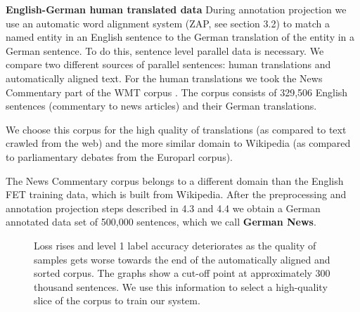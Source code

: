 \documentclass[11pt,a4paper]{article}
\begin{document}
\textbf{English-German human translated data} During annotation projection we use an automatic word alignment system (ZAP, see section 3.2) to match a named entity in an English sentence to the German translation of the entity in a German sentence. To do this, sentence level parallel data is necessary. We compare two different sources of parallel sentences: human translations and automatically aligned text. For the human translations we took the News Commentary part of the WMT corpus \cite{barrault2019findings}. The corpus consists of 329,506 English sentences (commentary to news articles) and their German translations. 

We choose this corpus for the high quality of translations (as compared to text crawled from the web) and the more similar domain to Wikipedia (as compared to parliamentary debates from the Europarl corpus).

The News Commentary corpus belongs to a different domain than the English FET training data, which is built from Wikipedia. After the preprocessing and annotation projection steps described in 4.3 and 4.4 we obtain a German annotated data set of 500,000 sentences, which we call \textbf{German News}.

\begin{figure}[h!]%
    \centering
    \qquad
    \caption{Loss rises and level 1 label accuracy deteriorates as the quality of samples gets worse towards the end of the automatically aligned and sorted corpus. The graphs show a cut-off point at approximately 300 thousand sentences. We use this information to select a high-quality slice of the corpus to train our system.}%
    \label{fig:loss}%
\end{figure}
\end{document}
